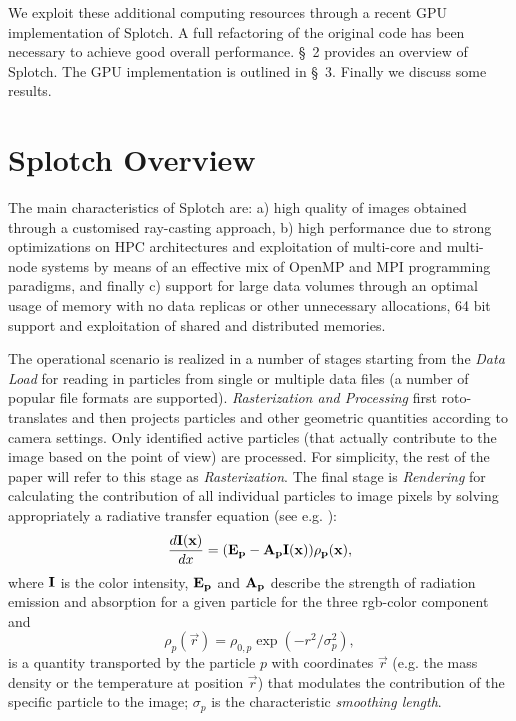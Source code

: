 We exploit these additional computing resources through a recent GPU implementation of Splotch. A full refactoring of the original code has been necessary to achieve good overall performance. \S~2 provides an overview of Splotch. The GPU implementation is outlined in \S~3. Finally we discuss some results.

\section{Splotch Overview}

The main characteristics of Splotch are: a) high quality of images obtained through a customised ray-casting
approach, b) high performance due to strong optimizations on HPC architectures and exploitation of multi-core and multi-node
systems by means of an effective mix of OpenMP and MPI programming paradigms, and finally c) support for large data volumes through an optimal usage of memory with
no data replicas or other unnecessary allocations, 64 bit support and exploitation
of shared and distributed memories.

The operational scenario is realized in a number of stages  starting from the
{\it Data Load} for reading in particles from single or multiple data files (a number of popular file
formats are supported). {\it Rasterization and Processing}  first roto-translates and then projects particles and other geometric quantities according to camera settings. Only identified active particles 
(that actually contribute to the image based on the point of view)
are processed. For simplicity, the rest
of the paper will refer to this stage as {\it Rasterization}. The final stage is {\it Rendering} for calculating the contribution of all individual particles to image pixels by
solving appropriately a radiative transfer equation (see e.g. \citet{1991par..book.....S}):
\begin{equation}\label{rad}
\frac{d\bf{I}(x)}{dx}=(\bf{E}_p-\bf{A}_p\bf{I}(x))\rho_p(x),
\end{equation}
where $\bf{I}$ is the color intensity, $\bf{E}_p$ and $\bf{A}_p$ 
describe the strength of radiation emission and absorption
for a given particle for the three rgb-color component and 
\begin{equation}\label{smooth}
\rho_p(\vec r)=\rho_{0,p}\exp(-r^2/\sigma_p^2),
\end{equation}
is a quantity transported by the particle $p$ with coordinates $\vec r$
(e.g. the mass density or the temperature at position $\vec r$)
that modulates the contribution of the specific particle to the image; $\sigma_p$
is the characteristic {\it smoothing length}.


